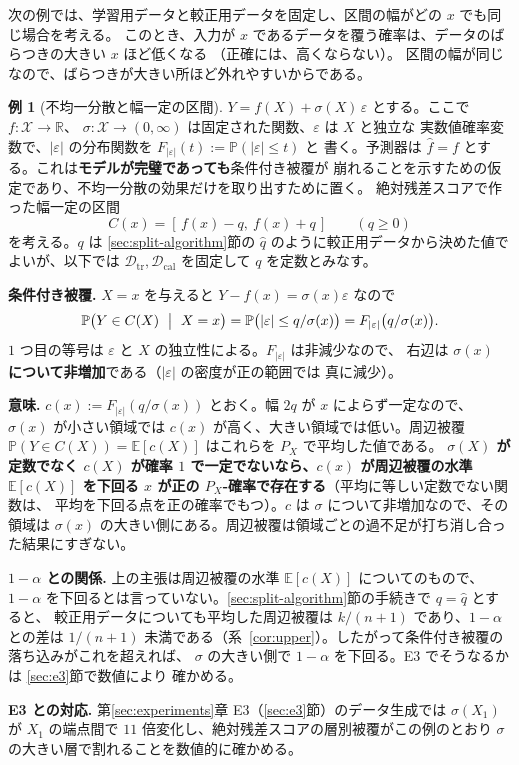 \documentclass[a4paper,11pt]{jsarticle}
\theoremstyle{definition}
\newtheorem{example}[definition]{例}
\theoremstyle{plain}
\theoremstyle{remark}
\newcommand{\Prob}{\mathbb{P}}
\newcommand{\Exp}{\mathbb{E}}
\newcommand{\Real}{\mathbb{R}}
\newcommand{\Dtr}{\mathcal{D}_{\mathrm{tr}}}     %
\newcommand{\Dcal}{\mathcal{D}_{\mathrm{cal}}}   %
\newcommand{\qhat}{\hat{q}}
\newcommand{\fhat}{\hat{f}}
\begin{document}
次の例では、学習用データと較正用データを固定し、区間の幅がどの $x$ でも同じ場合を考える。
このとき、入力が $x$ であるデータを覆う確率は、データのばらつきの大きい $x$ ほど低くなる
（正確には、高くならない）。
区間の幅が同じなので、ばらつきが大きい所ほど外れやすいからである。

\begin{example}[不均一分散と幅一定の区間]
  \label{ex:x-conditional-hetero}
  $Y=f(X)+\sigma(X)\,\varepsilon$ とする。ここで $f\colon\mathcal{X}\to\Real$、
  $\sigma\colon\mathcal{X}\to(0,\infty)$ は固定された関数、$\varepsilon$ は $X$ と独立な
  実数値確率変数で、$|\varepsilon|$ の分布関数を $F_{|\varepsilon|}(t):=\Prob(|\varepsilon|\le t)$ と
  書く。予測器は $\fhat=f$ とする。これは\textbf{モデルが完璧であっても}条件付き被覆が
  崩れることを示すための仮定であり、不均一分散の効果だけを取り出すために置く。
  絶対残差スコアで作った幅一定の区間
  \begin{equation*}
    C(x)=[\,f(x)-q,\ f(x)+q\,]\qquad(q\ge0)
  \end{equation*}
  を考える。$q$ は \ref{sec:split-algorithm}節の $\qhat$ のように較正用データから決めた値で
  よいが、以下では $\Dtr,\Dcal$ を固定して $q$ を定数とみなす。

  \textbf{条件付き被覆.} $X=x$ を与えると $Y-f(x)=\sigma(x)\varepsilon$ なので
  \begin{equation*}
    \Prob\bigl(Y\in C(X)\ \bigm|\ X=x\bigr)
    =\Prob\bigl(|\varepsilon|\le q/\sigma(x)\bigr)
    =F_{|\varepsilon|}\bigl(q/\sigma(x)\bigr).
  \end{equation*}
  $1$ つ目の等号は $\varepsilon$ と $X$ の独立性による。$F_{|\varepsilon|}$ は非減少なので、
  右辺は \textbf{$\sigma(x)$ について非増加}である（$|\varepsilon|$ の密度が正の範囲では
  真に減少）。

  \textbf{意味.} $c(x):=F_{|\varepsilon|}(q/\sigma(x))$ とおく。幅 $2q$ が $x$ によらず一定なので、
  $\sigma(x)$ が小さい領域では $c(x)$ が高く、大きい領域では低い。周辺被覆
  $\Prob(Y\in C(X))=\Exp[c(X)]$ はこれらを $P_X$ で平均した値である。
  \textbf{$\sigma(X)$ が定数でなく $c(X)$ が確率 $1$ で一定でないなら、$c(x)$ が周辺被覆の水準
  $\Exp[c(X)]$ を下回る $x$ が正の $P_X$-確率で存在する}（平均に等しい定数でない関数は、
  平均を下回る点を正の確率でもつ）。$c$ は $\sigma$ について非増加なので、その領域は
  $\sigma(x)$ の大きい側にある。周辺被覆は領域ごとの過不足が打ち消し合った結果にすぎない。

  \textbf{$1-\alpha$ との関係.} 上の主張は周辺被覆の水準 $\Exp[c(X)]$ についてのもので、
  $1-\alpha$ を下回るとは言っていない。\ref{sec:split-algorithm}節の手続きで $q=\qhat$ とすると、
  較正用データについても平均した周辺被覆は $k/(n+1)$ であり、$1-\alpha$ との差は $1/(n+1)$
  未満である（系~\ref{cor:upper}）。したがって条件付き被覆の落ち込みがこれを超えれば、
  $\sigma$ の大きい側で $1-\alpha$ を下回る。E3 でそうなるかは \ref{sec:e3}節で数値により
  確かめる。

  \textbf{E3 との対応.} 第\ref{sec:experiments}章 E3（\ref{sec:e3}節）のデータ生成では
  $\sigma(X_1)$ が $X_1$ の端点間で $11$ 倍変化し、絶対残差スコアの層別被覆がこの例のとおり
  $\sigma$ の大きい層で割れることを数値的に確かめる。
\end{example}
\end{document}
